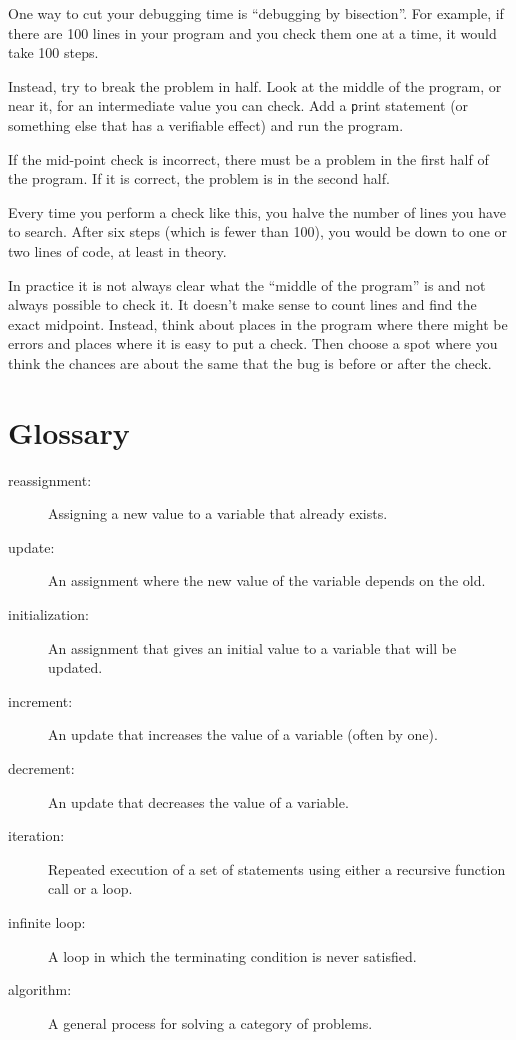 \documentclass[
DIV=11,
fontsize=12,
twoside,
headinclude=false,
titlepage=firstiscover,
abstract=true,
headsepline=true,
footsepline=true,
chapterprefix=true, %
headings=big,
bibliography=totoc,%
captions=tableheading
]{scrbook}
\theoremstyle{definition}
\begin{document}
One way to cut your debugging time is ``debugging by bisection''.
For example, if there are 100 lines in your program and you
check them one at a time, it would take 100 steps.

Instead, try to break the problem in half.  Look at the middle
of the program, or near it, for an intermediate value you
can check.  Add a {\texttt print} statement (or something else
that has a verifiable effect) and run the program.

If the mid-point check is incorrect, there must be a problem in the
first half of the program.  If it is correct, the problem is
in the second half.

Every time you perform a check like this, you halve the number of
lines you have to search.  After six steps (which is fewer than 100),
you would be down to one or two lines of code, at least in theory.

In practice it is not always clear what
the ``middle of the program'' is and not always possible to
check it.  It doesn't make sense to count lines and find the
exact midpoint.  Instead, think about places
in the program where there might be errors and places where it
is easy to put a check.  Then choose a spot where you
think the chances are about the same that the bug is before
or after the check.




\section{Glossary}

\begin{description}

\item[reassignment:] Assigning a new value to a variable that
already exists.

\item[update:] An assignment where the new value of the variable
depends on the old.

\item[initialization:] An assignment that gives an initial value to
a variable that will be updated.

\item[increment:] An update that increases the value of a variable
(often by one).

\item[decrement:] An update that decreases the value of a variable.

\item[iteration:] Repeated execution of a set of statements using
either a recursive function call or a loop.

\item[infinite loop:] A loop in which the terminating condition is
never satisfied.

\item[algorithm:]  A general process for solving a category of
problems.

\end{description}
\end{document}
